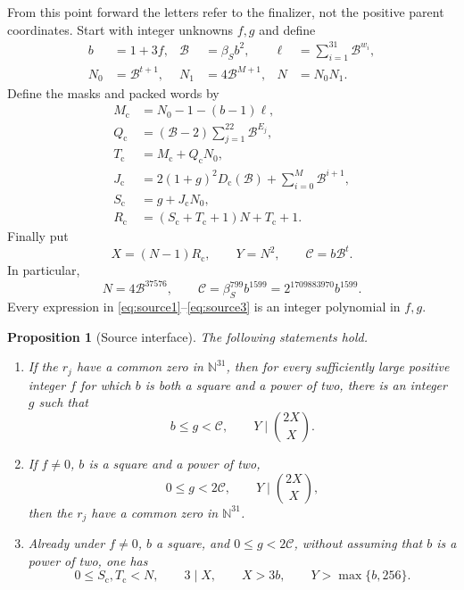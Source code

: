 \documentclass[11pt]{article}
\newcommand{\N}{\mathbb N}
\newcommand{\BB}{\mathcal B}
\newcommand{\capC}{\mathscr C}
\newcommand{\Dcode}{D_{\mathrm c}}
\newtheorem{proposition}[theorem]{Proposition}
\theoremstyle{definition}
\theoremstyle{remark}
\numberwithin{equation}{section}
\begin{document}
From this point forward the letters refer to the finalizer, not the
positive parent coordinates. Start with integer unknowns \(f,g\) and define
\begin{equation}\label{eq:source1}
\begin{aligned}
 b&=1+3f,& \BB&=\beta_Sb^2,&
 \ell&=\sum_{i=1}^{31}\BB^{w_i},\\
 N_0&=\BB^{t+1},&
 N_1&=4\BB^{M+1},&
 N&=N_0N_1.
\end{aligned}
\end{equation}
Define the masks and packed words by
\begin{equation}\label{eq:source2}
\begin{aligned}
 M_{\mathrm c}&=N_0-1-(b-1)\ell,\\
 Q_{\mathrm c}&=(\BB-2)\sum_{j=1}^{22}\BB^{E_j},\\
 T_{\mathrm c}&=M_{\mathrm c}+Q_{\mathrm c}N_0,\\
 J_{\mathrm c}&=2(1+g)^2\Dcode(\BB)+
                      \sum_{i=0}^{M}\BB^{i+1},\\
 S_{\mathrm c}&=g+J_{\mathrm c}N_0,\\
 R_{\mathrm c}&=(S_{\mathrm c}+T_{\mathrm c}+1)N+T_{\mathrm c}+1.
\end{aligned}
\end{equation}
Finally put
\begin{equation}\label{eq:source3}
 X=(N-1)R_{\mathrm c},\qquad Y=N^2,\qquad
 \capC=b\BB^t.
\end{equation}
In particular,
\[
 N=4\BB^{37576},\qquad
 \capC=\beta_S^{799}b^{1599}
       =2^{1709883970}b^{1599}.
\]
Every expression in \eqref{eq:source1}--\eqref{eq:source3} is an integer
polynomial in \(f,g\).

\begin{proposition}[Source interface]\label{prop:source}
The following statements hold.
\begin{enumerate}[label=\textup{(\roman*)}]
\item If the \(r_j\) have a common zero in \(\N^{31}\), then for every
sufficiently large positive integer \(f\) for which \(b\) is both a
square and a power of two, there is an integer \(g\) such that
\[
 b\le g<\capC,\qquad Y\mid\binom{2X}{X}.
\]
\item If \(f\ne0\), \(b\) is a square and a power of two,
\[
 0\le g<2\capC,\qquad Y\mid\binom{2X}{X},
\]
then the \(r_j\) have a common zero in \(\N^{31}\).
\item Already under \(f\ne0\), \(b\) a square, and \(0\le g<2\capC\),
without assuming that \(b\) is a power of two, one has
\[
 0\le S_{\mathrm c},T_{\mathrm c}<N,\qquad
 3\mid X,\qquad X>3b,\qquad Y>\max\{b,256\}.
\]
\end{enumerate}
\end{proposition}
\end{document}
